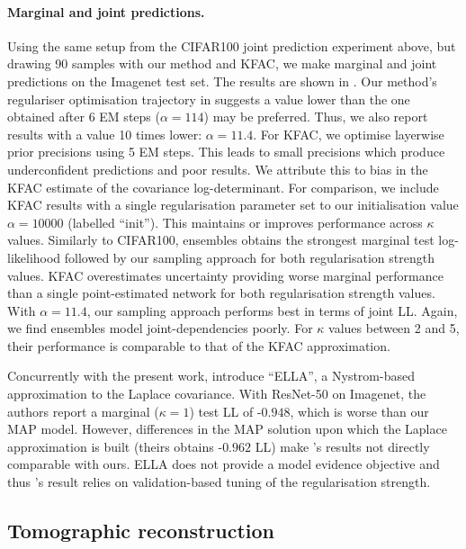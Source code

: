 \paragraph{Marginal and joint predictions.}
Using the same setup from the CIFAR100 joint prediction experiment above, but drawing 90 samples with our method and KFAC, we make marginal and joint predictions on the Imagenet test set. The results are shown in . Our method's regulariser optimisation trajectory in  suggests a value lower than the one obtained after 6 EM steps ($\alpha=114$) may be preferred. Thus, we also report results with a value 10 times lower: $\alpha=11.4$. 
For KFAC, we optimise layerwise prior precisions using 5 EM steps. This leads to small precisions which produce underconfident predictions and poor results. We attribute this to bias in the KFAC estimate of the covariance log-determinant. 
For comparison, we include KFAC results with a single regularisation parameter set to our initialisation value $\alpha{=}10000$ (labelled ``init''). This maintains or improves performance across $\kappa$ values.
Similarly to CIFAR100, ensembles obtains the strongest marginal test log-likelihood followed by our sampling approach for both regularisation strength values. KFAC overestimates uncertainty providing worse marginal performance than a single point-estimated network for both regularisation strength values. With $\alpha{=}11.4$, our sampling approach performs best in terms of joint LL. Again, we find ensembles model joint-dependencies poorly. For $\kappa$ values between 2 and 5, their performance is comparable to that of the KFAC approximation. 

Concurrently with the present work, \textcite{Deng2022Accelerated} introduce ``ELLA'', a Nystrom-based approximation to the Laplace covariance. With ResNet-50 on Imagenet, the authors report a marginal ($\kappa{=}1$) test LL of -$0.948$, which is worse than our MAP model. However, differences in the MAP solution upon which the Laplace approximation is built (theirs obtains -$0.962$ LL) make \textcite{Deng2022Accelerated}'s results not directly comparable with ours. 
ELLA does not provide a model evidence objective and thus \textcite{Deng2022Accelerated}'s result relies on validation-based tuning of the regularisation strength.

\subsection{Tomographic reconstruction} \label{sec:DIP}

